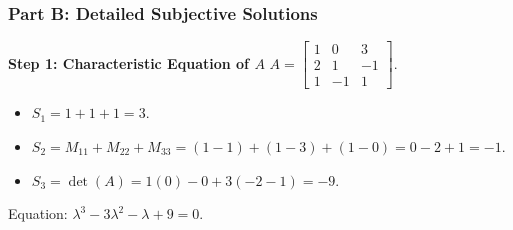 \subsubsection*{Part B: Detailed Subjective Solutions}

\begin{solutionbox}
\textbf{Step 1: Characteristic Equation of $A$}
$A = \begin{bmatrix} 1 & 0 & 3 \\ 2 & 1 & -1 \\ 1 & -1 & 1 \end{bmatrix}$.
\begin{itemize}[leftmargin=6mm]
    \item $S_1 = 1 + 1 + 1 = 3$.
    \item $S_2 = M_{11} + M_{22} + M_{33} = (1 - 1) + (1 - 3) + (1 - 0) = 0 - 2 + 1 = -1$.
    \item $S_3 = \det(A) = 1(0) - 0 + 3(-2 - 1) = -9$.
\end{itemize}
Equation: $\lambda^3 - 3\lambda^2 - \lambda + 9 = 0$.


\end{solutionbox}

